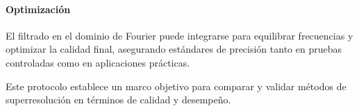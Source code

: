         \paragraph{Optimización}
        
            El filtrado en el dominio de Fourier puede integrarse para equilibrar frecuencias y optimizar la calidad final, asegurando estándares de precisión tanto en pruebas controladas como en aplicaciones prácticas.
        
            Este protocolo establece un marco objetivo para comparar y validar métodos de superresolución en términos de calidad y desempeño.
            
            